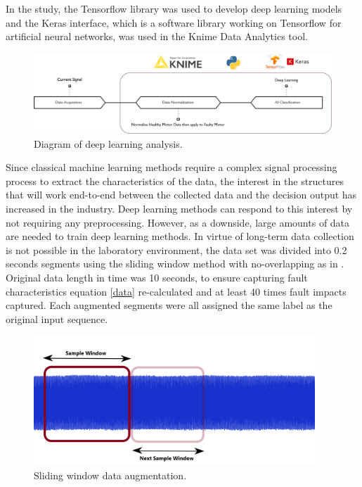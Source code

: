 In the study, the Tensorflow library was used to develop deep learning models and the Keras interface, which is a software library working on Tensorflow for artificial neural networks, was used in the Knime Data Analytics tool.

\begin{figure}[h]
	\centering
	\includegraphics[width=400pt,keepaspectratio=true]{./fig/method4.PNG}
	\caption{Diagram of deep learning analysis.}	
	\label{method4}
\end{figure}

Since classical machine learning methods require a complex signal processing process to extract the characteristics of the data, the interest in the structures that will work end-to-end between the collected data and the decision output has increased in the industry. Deep learning methods can respond to this interest by not requiring any preprocessing. However, as a downside, large amounts of data are needed to train deep learning methods. In virtue of long-term data collection is not possible in the laboratory environment, the data set was divided into 0.2 seconds segments using the sliding window method with no-overlapping as in \cite{shenfield2020novel}. Original data length in time was 10 seconds, to ensure capturing fault characteristics equation \ref{data} re-calculated and at least 40 times fault impacts captured. Each augmented segments were all assigned the same label as the original input sequence.

\begin{figure}[h]
	\centering
	\includegraphics[width=300pt,keepaspectratio=true]{./fig/data.png}
	\caption{Sliding window data augmentation.}	
	\label{dataslide}
\end{figure}

